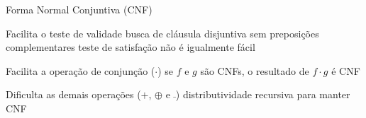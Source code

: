 \expandafter\documentclass\expandafter[table, usenames, svgnames, dvipsnames,14pt, \classopts]{beamer}
\begin{document}
\begin{frame}{Forma Normal Conjuntiva (\uppercase{CNF})}

    \begin{outline}
        \1 Facilita o teste de validade
            \2[-] busca de cláusula disjuntiva sem preposições complementares
            \2[-] teste de satisfação não é igualmente fácil
        
        \vspace{1em}
        
        \1 Facilita a operação de conjunção ($\cdot$)
            \2[-] se $f$ e $g$ são CNFs, o resultado de $f \cdot g$ é CNF
        
        \vspace{1em}
        
        \1 Dificulta as demais operações ($+$, $\oplus$ e $\bar{~}$)
            \2[-] distributividade recursiva para manter CNF
    \end{outline}

    \begin{center}
    \end{center}
    
\end{frame}
\end{document}
